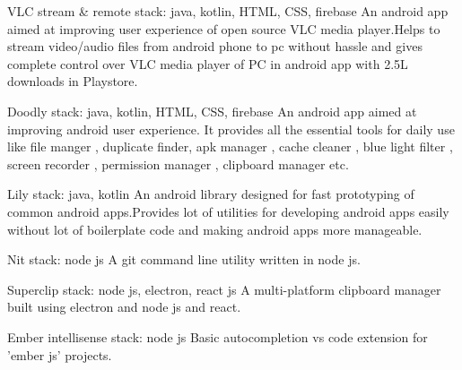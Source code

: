 
\begin{cventries}
  \cvproject
    {VLC stream \& remote} %
    {stack: java, kotlin, HTML, CSS, firebase} %
    { \quad An android app aimed at improving user experience of open source VLC media player.Helps to stream video/audio files from android phone to pc without hassle and gives complete control over VLC media player of PC in android app with 2.5L downloads in Playstore.} %
  
  \cvproject
    {Doodly}
    {stack: java, kotlin, HTML, CSS, firebase} %
    { \quad An android app aimed at improving android user experience. It provides all the essential tools for daily use like file manger , duplicate finder, apk manager , cache cleaner , blue light filter , screen recorder , permission manager , clipboard manager etc.}

  \cvproject
    {Lily}
    {stack: java, kotlin} %
    { \quad An android library designed for fast prototyping of common android apps.Provides lot of utilities for developing android apps easily without lot of boilerplate code and making android apps more manageable.}

  \cvproject
    {Nit}
    {stack: node js} %
    { \quad A git command line utility written in node js.}

  \cvproject
    {Superclip}
    {stack: node js, electron, react js} %
    { \quad A multi-platform clipboard manager built using electron and node js and react.}
  
  \cvproject
    {Ember intellisense}
    {stack: node js} %
    { \quad Basic autocompletion vs code extension for 'ember js' projects.}

\end{cventries}
